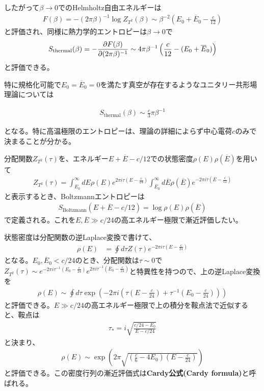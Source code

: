 したがって$\beta\to 0$でのHelmholtz自由エネルギーは
\begin{align}
F(\beta)=-(2\pi\beta)^{-1}\log Z_{T^2}(\beta)\sim \beta^{-2}\left(E_0+\overline{E}_0-\frac{c}{12}\right)
\end{align}
と評価され、同様に熱力学的エントロピーは$\beta\to 0$で
\begin{align}
S_\text{thermal}(\beta)=-\frac{\partial F(\beta)}{\partial (2\pi\beta)^{-1}}
\sim 4\pi\beta^{-1}\left( \frac{c}{12}-(E_0+\overline{E}_0) \right)
\end{align}
と評価できる。

特に規格化可能で$E_0=\overline{E}_0=0$を満たす真空が存在するようなユニタリー共形場理論については
\begin{oframed}
\begin{align}\label{cardyCE}
S_\text{thermal}(\beta)\sim \frac{c}{3}\pi \beta^{-1}
\end{align}
\end{oframed}
となる。特に高温極限のエントロピーは、理論の詳細によらず中心電荷$c$のみで決まることが分かる。


分配関数$Z_{T^2}(\tau)$を、エネルギー$E+\overline{E}-c/12$での状態密度$\rho(E)\rho(\overline{E})$を用いて
\begin{align}
Z_{T^2}(\tau)=\int_{E_0}^{\infty}dE \rho(E)e^{2\pi i\tau (E-\frac{c}{24})} \int_{\overline{E}_0}^{\infty} d\overline{E} \rho(\overline{E})e^{-2\pi i\overline{\tau}(\overline{E}-\frac{c}{12})}
\end{align}
と表示するとき、Boltzmannエントロピーは
\begin{align}
S_\text{Boltzmann}(E+\overline{E}-c/12)=\log \rho(E)\rho(\overline{E})
\end{align}
で定義される。これを$E,\overline{E}\gg c/24$の高エネルギー極限で漸近評価したい。

状態密度は分配関数の逆Laplace変換で書けて、
\begin{align}
\rho(E)&=\oint d\tau Z(\tau)e^{-2\pi i\tau (E-\frac{c}{24})}
\end{align}
となる。$E_0,\overline{E}_0<c/24$のとき、分配関数は$\tau\sim 0$で$Z_{T^2}(\tau)\sim e^{-2\pi i \tau^{-1} (E_0-\frac{c}{24})}e^{2\pi i \overline{\tau}^{-1} (\overline{E}_0-\frac{c}{24})}
$と特異性を持つので、上の逆Laplace変換を
\begin{align}
\rho(E)\sim \oint d\tau \exp\left(-2\pi i \left(\tau (E-\frac{c}{24})+\tau^{-1}(E_0-\frac{c}{24}) \right) \right)
\end{align}
と評価できる。$E\gg c/24$の高エネルギー極限で上の積分を鞍点法で近似すると、鞍点は
\begin{align}
\tau_\ast =i\sqrt{\frac{c/24-E_0}{E-c/24}}
\end{align}
と決まり、
\begin{align}
\rho(E)\sim \exp\left( 2\pi\sqrt{\left(\frac{c}{6}-4E_0\right)\left(E-\frac{c}{24}\right)} \right)
\end{align}
と評価できる。この密度行列の漸近評価式は\textbf{Cardy公式(Cardy formula)}\cite{Cardy:1991kr}と呼ばれる。

